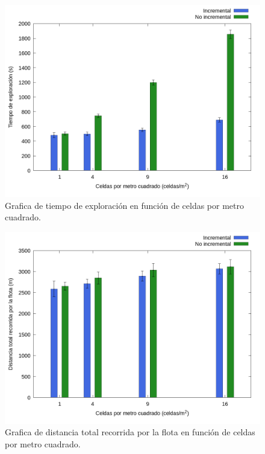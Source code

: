 \begin{figure}[H]
  \centerfloat

  \includegraphics[clip=true, width=\graphlen]{imagenes/graficas_chicas/graficas_histo_num/incrementalidad/exploration_time.png}

  \caption{Grafica de tiempo de exploración en función de celdas por metro cuadrado.}\label{fig:gra:inc:et}

\end{figure}

\begin{figure}[H]
  \centerfloat

  \includegraphics[clip=true, width=\graphlen]{imagenes/graficas_chicas/graficas_histo_num/incrementalidad/exploration_cost.png}

  \caption{Grafica de distancia total recorrida por la flota  en función de celdas por metro cuadrado.}\label{fig:gra:inc:ec}

\end{figure}

